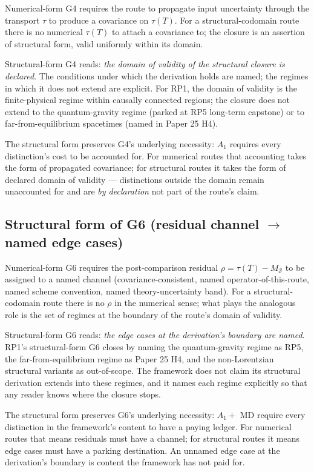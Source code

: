 Numerical-form G4 requires the route to propagate input uncertainty through the transport $\tau$ to produce a covariance on $\tau(T)$. For a structural-codomain route there is no numerical $\tau(T)$ to attach a covariance to; the closure is an assertion of structural form, valid uniformly within its domain.

Structural-form G4 reads: \emph{the domain of validity of the structural closure is declared}. The conditions under which the derivation holds are named; the regimes in which it does not extend are explicit. For RP1, the domain of validity is the finite-physical regime within causally connected regions; the closure does not extend to the quantum-gravity regime (parked at RP5 long-term capstone) or to far-from-equilibrium spacetimes (named in Paper 25 H4).

The structural form preserves G4's underlying necessity: $A_1$ requires every distinction's cost to be accounted for. For numerical routes that accounting takes the form of propagated covariance; for structural routes it takes the form of declared domain of validity --- distinctions outside the domain remain unaccounted for and are \emph{by declaration} not part of the route's claim.

\subsection{Structural form of G6 (residual channel $\to$ named edge cases)}
\label{subsec:G6-structural}

Numerical-form G6 requires the post-comparison residual $\rho = \tau(T) - M_{\mathcal{S}}$ to be assigned to a named channel (covariance-consistent, named operator-of-this-route, named scheme convention, named theory-uncertainty band). For a structural-codomain route there is no $\rho$ in the numerical sense; what plays the analogous role is the set of regimes at the boundary of the route's domain of validity.

Structural-form G6 reads: \emph{the edge cases at the derivation's boundary are named}. RP1's structural-form G6 closes by naming the quantum-gravity regime as RP5, the far-from-equilibrium regime as Paper 25 H4, and the non-Lorentzian structural variants as out-of-scope. The framework does not claim its structural derivation extends into these regimes, and it names each regime explicitly so that any reader knows where the closure stops.

The structural form preserves G6's underlying necessity: $A_1 + $ MD require every distinction in the framework's content to have a paying ledger. For numerical routes that means residuals must have a channel; for structural routes it means edge cases must have a parking destination. An unnamed edge case at the derivation's boundary is content the framework has not paid for.

